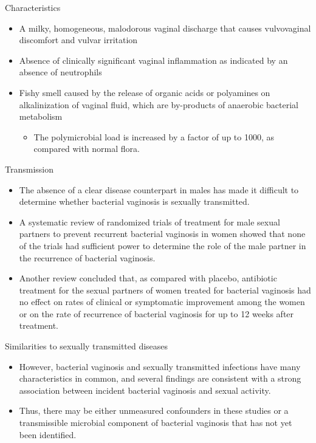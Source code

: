 \documentclass{beamer}
\begin{document}
\begin{frame}{Characteristics}
    \begin{itemize}
        \item A milky, homogeneous, malodorous vaginal discharge that causes
              vulvovaginal discomfort and vulvar irritation
        \item Absence of clinically significant vaginal inflammation as
              indicated by an absence of neutrophils
        \item Fishy smell caused by the release of organic acids or polyamines
              on alkalinization of vaginal fluid, which are by-products of
              anaerobic bacterial metabolism
        \begin{itemize}
            \item The polymicrobial load is increased by a factor of up to
                  1000, as compared with normal flora.
        \end{itemize}
    \end{itemize}
\end{frame}

\begin{frame}{Transmission}
    \begin{itemize}
        \item The absence of a clear disease counterpart in males has made it
              difficult to determine whether bacterial vaginosis is sexually
              transmitted.
        \item A systematic review of randomized trials of treatment for male
              sexual partners to prevent recurrent bacterial vaginosis in women
              showed that none of the trials had sufficient power to determine
              the role of the male partner in the recurrence of bacterial
              vaginosis.
        \item Another review concluded that, as compared with placebo,
              antibiotic treatment for the sexual partners of women treated for
              bacterial vaginosis had no effect on rates of clinical or
              symptomatic improvement among the women or on the rate of
              recurrence of bacterial vaginosis for up to 12 weeks after
              treatment.
    \end{itemize}
\end{frame}

\begin{frame}{Similarities to sexually transmitted diseases}
    \begin{itemize}
        \item However, bacterial vaginosis and sexually transmitted infections
              have many characteristics in common, and several findings are
              consistent with a strong association between incident bacterial
              vaginosis and sexual activity.
        \item Thus, there may be either unmeasured confounders in these studies
              or a transmissible microbial component of bacterial vaginosis
              that has not yet been identified.
    \end{itemize}
\end{frame}
\end{document}
